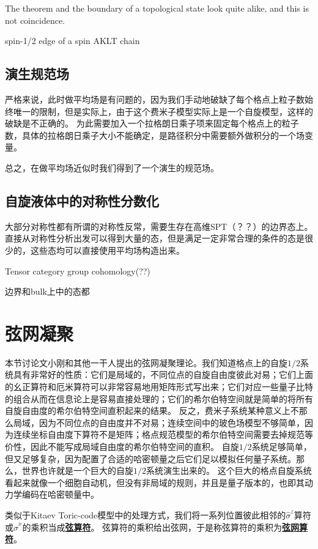 \documentclass[hyperref, UTF8, a4paper]{ctexart}
\newcommand*{\concept}[1]{\underline{\textbf{#1}}}
\begin{document}
The theorem and the boundary of a topological state look quite alike, and this is not coincidence.

spin-1/2 edge of a spin AKLT chain

\subsection{演生规范场}

严格来说，此时做平均场是有问题的，因为我们手动地破缺了每个格点上粒子数始终唯一的限制，但是实际上，由于这个费米子模型实际上是一个自旋模型，这样的破缺是不正确的。
为此需要加入一个拉格朗日乘子项来固定每个格点上的粒子数，具体的拉格朗日乘子大小不能确定，是路径积分中需要额外做积分的一个场变量。

总之，在做平均场近似时我们得到了一个演生的规范场。

\subsection{自旋液体中的对称性分数化}

大部分对称性都有所谓的对称性反常，需要生存在高维SPT（？？）的边界态上。
直接从对称性分析出发可以得到大量的态，但是满足一定非常合理的条件的态是很少的，这些态均可以直接使用平均场构造出来。

Tensor category group cohomology(??)

边界和bulk上中的态都

\section{弦网凝聚}

本节讨论文小刚和其他一干人提出的弦网凝聚理论。我们知道格点上的自旋$1/2$系统具有非常好的性质：它们是局域的，不同位点的自旋自由度彼此对易；它们上面的幺正算符和厄米算符可以非常容易地用矩阵形式写出来；它们对应一些量子比特的组合从而在信息论上是容易直接处理的；它们的希尔伯特空间就是简单的将所有自旋自由度的希尔伯特空间直积起来的结果。
反之，费米子系统某种意义上不那么局域，因为不同位点的自由度并不对易；连续空间中的玻色场模型不够简单，因为连续坐标自由度下算符不是矩阵；格点规范模型的希尔伯特空间需要去掉规范等价性，因此不能写成局域自由度的希尔伯特空间的直积。
自旋$1/2$系统足够简单，但又足够复杂，因为配置了合适的哈密顿量之后它们足以模拟任何量子系统。那么，世界也许就是一个巨大的自旋$1/2$系统演生出来的。
这个巨大的格点自旋系统看起来就像一个细胞自动机，但没有非局域的规则，并且是量子版本的，也即其动力学编码在哈密顿量中。

类似于Kitaev Toric-code模型中的处理方式，我们将一系列位置彼此相邻的$\hat{\sigma}^z$算符或$\hat{\sigma}^x$的乘积当成\concept{弦算符}。
弦算符的乘积给出弦网，于是称弦算符的乘积为\concept{弦网算符}。
\end{document}
